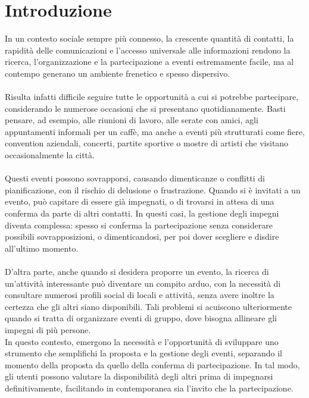\chapter*{Introduzione}

In un contesto sociale sempre più connesso, la crescente quantità di contatti, 
la rapidità delle comunicazioni e l'accesso universale alle informazioni 
rendono la ricerca, l'organizzazione e la partecipazione a eventi estremamente facile, 
ma al contempo generano un ambiente frenetico e spesso dispersivo.\\
\\
Risulta infatti difficile seguire tutte le opportunità a cui si potrebbe partecipare, 
considerando le numerose occasioni che si presentano quotidianamente. 
Basti pensare, ad esempio, alle riunioni di lavoro, alle serate con amici, agli appuntamenti informali per un caffè, 
ma anche a eventi più strutturati come fiere, convention aziendali, concerti, partite sportive o
mostre di artisti che visitano occasionalmente la città.\\
\\
Questi eventi possono sovrapporsi, causando dimenticanze o conflitti di pianificazione, 
con il rischio di delusione o frustrazione. 
Quando si è invitati a un evento, può capitare di essere già impegnati, 
o di trovarsi in attesa di una conferma da parte di altri contatti.
In questi casi, la gestione degli impegni diventa complessa: 
spesso si conferma la partecipazione senza considerare possibili sovrapposizioni, o dimenticandosi, 
per poi dover scegliere e disdire all'ultimo momento. \\
\\
D'altra parte, anche quando si desidera proporre un evento, 
la ricerca di un'attività interessante può diventare un compito arduo, 
con la necessità di consultare numerosi profili social di locali e attività,
senza avere inoltre la certezza che gli altri siano disponibili.
Tali problemi si acuiscono ulteriormente quando si tratta di organizzare eventi di gruppo, 
dove bisogna allineare gli impegni di più persone.\\
\clearpage
In questo contesto,
emergono la necessità e l'opportunità di sviluppare uno strumento
che semplifichi la proposta e la gestione degli eventi,
separando il momento della proposta da quello della conferma di partecipazione. 
In tal modo, gli utenti possono valutare la disponibilità degli altri prima di impegnarsi definitivamente, 
facilitando in contemporanea sia l'invito che la partecipazione.\\ 
